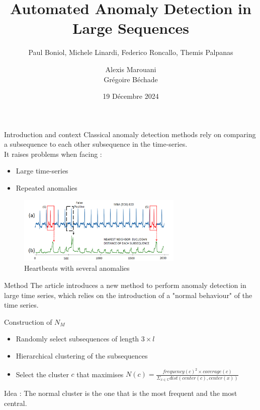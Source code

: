 \documentclass[french]{beamer}
\title{Automated Anomaly Detection in Large Sequences}
\subtitle{ Paul Boniol, Michele Linardi, Federico Roncallo, Themis Palpanas}
\author{ Alexis Marouani \\  Grégoire Béchade}
\date{19 Décembre 2024}
\begin{document}
\begin{frame}
	\titlepage
\end{frame}


\begin{frame}{Introduction and context}
    Classical anomaly detection methods rely on comparing a subsequence to each other subsequence in the time-series. \\
    It raises problems when facing : 
    \begin{itemize}
        \item Large time-series
        \item Repeated anomalies\\[0.5cm]
    \end{itemize}

    \begin{figure}
        \centering
        \includegraphics[width=0.7\textwidth]{heartbeats.png}
        \caption{Heartbeats with several anomalies}
    \end{figure}
    
\end{frame}

\begin{frame}{Method}
    The article introduces a new method to perform anomaly detection in large time series, which relies on the introduction of a "normal behaviour" of the time series.\\[1cm]
    \begin{exampleblock}{Construction of $N_M$}
        \begin{itemize}
            \item Randomly select subsequences of length $3 \times l$
            \item Hierarchical clustering of the subsequences
            \item Select the cluster $c$ that maximises $N(c) = \frac{frequency (c)^2 \times coverage (c) }{ \Sigma_{x \in \mathbb{C} } dist(center(c), center(x))}$
        \end{itemize}
    

    \end{exampleblock}
\tiny{Idea : The normal cluster is the one that is the most frequent and the most central.}
    
\end{frame}
\end{document}

